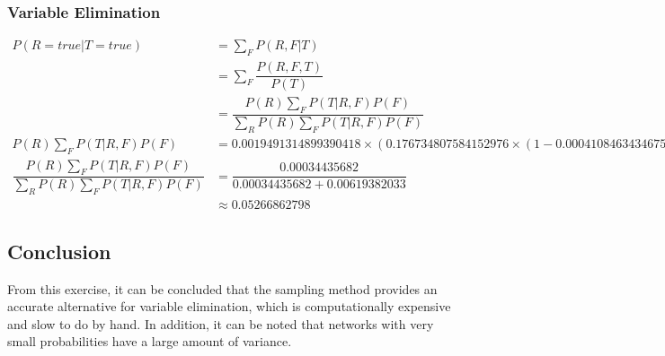 \documentclass[11pt]{article}
\begin{document}
    \hypertarget{variable-elimination}{%
\subsubsection{Variable Elimination}\label{variable-elimination}}

\[
\begin{align}
P(R = true | T = true) & = \sum_{F} P(R, F|T) \\
& = \sum_{F} \dfrac{P(R,F,T)}{P(T)} \\
& = \dfrac{P(R) \sum_{F} P(T|R,F)P(F)}{\sum_{R} P(R) \sum_{F} P(T|R,F) P(F)} \\
P(R) \sum_{F} P(T|R,F)P(F) & = 0.0019491314899390418 \times (0.176734807584152976 \times (1-0.0004108463434675431) + 0.0236974833272821081 \times 0.0004108463434675431) \approx 0.00034435682 \\
\dfrac{P(R) \sum_{F} P(T|R,F)P(F)}{\sum_{R} P(R) \sum_{F} P(T|R,F) P(F)} & = \dfrac{0.00034435682}{0.00034435682 + 0.00619382033} \\
& \approx 0.05266862798
\end{align}
\]

    \hypertarget{conclusion}{%
\subsection{Conclusion}\label{conclusion}}

From this exercise, it can be concluded that the sampling method
provides an accurate alternative for variable elimination, which is
computationally expensive and slow to do by hand. In addition, it can be
noted that networks with very small probabilities have a large amount of
variance.


    
    
    
    
\end{document}
